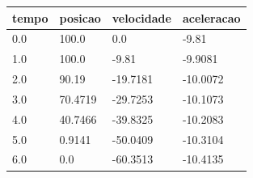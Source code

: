 \begin{tabular}{llll}
\toprule
tempo & posicao & velocidade & aceleracao \\
\midrule
0.0 & 100.0 & 0.0 & -9.81 \\
1.0 & 100.0 & -9.81 & -9.9081 \\
2.0 & 90.19 & -19.7181 & -10.0072 \\
3.0 & 70.4719 & -29.7253 & -10.1073 \\
4.0 & 40.7466 & -39.8325 & -10.2083 \\
5.0 & 0.9141 & -50.0409 & -10.3104 \\
6.0 & 0.0 & -60.3513 & -10.4135 \\
\bottomrule
\end{tabular}
